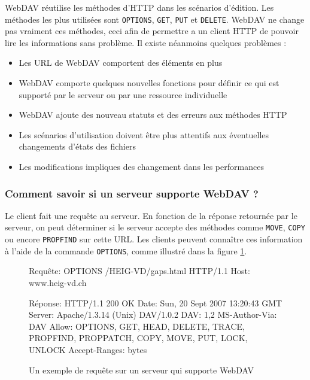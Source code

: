 \documentclass[a4paper, 11pt]{article}
\begin{document}
{		WebDAV réutilise les méthodes d'HTTP dans les scénarios d'édition. Les méthodes les plus utilisées sont \texttt{OPTIONS}, \texttt{GET}, \texttt{PUT} et \texttt{DELETE}. WebDAV ne change pas vraiment ces méthodes, ceci afin de permettre a un client HTTP de pouvoir lire les informations sans problème. Il existe néanmoins quelques problèmes :
		
		\begin{itemize}
			\item Les URL de WebDAV comportent des éléments en plus
			\item WebDAV comporte quelques nouvelles fonctions pour définir ce qui est supporté par le serveur ou par une ressource individuelle
			\item WebDAV ajoute des nouveau statuts et des erreurs aux méthodes HTTP
			\item Les scénarios d'utilisation doivent être plus attentifs aux éventuelles changements d'états des fichiers
			\item Les modifications impliques des changement dans les performances 
		\end{itemize}
		
		\subsubsection{Comment savoir si un serveur supporte WebDAV ?}
		
			Le client fait une requête au serveur. En fonction de la réponse retournée par le serveur, on peut déterminer si le serveur accepte des méthodes comme \texttt{MOVE}, \texttt{COPY} ou encore \texttt{PROPFIND} sur cette URL. Les clients peuvent connaître ces information à l'aide de la commande \texttt{OPTIONS}, comme illustré dans la figure \ref{fig:rep_http_DAV_support}.
			
			\begin{figure}[ht]
			\begin{center}
			\begin{boxedverbatim}
				Requête:
				OPTIONS /HEIG-VD/gaps.html HTTP/1.1
				Host: www.heig-vd.ch
			
				Réponse: 
				HTTP/1.1 200 OK
				Date: Sun, 20 Sept 2007 13:20:43 GMT
				Server: Apache/1.3.14 (Unix) DAV/1.0.2
				DAV: 1,2
				MS-Author-Via: DAV
				Allow: OPTIONS, GET, HEAD, DELETE, TRACE, PROPFIND,
				       PROPPATCH, COPY, MOVE, PUT, LOCK, UNLOCK
				Accept-Ranges: bytes
			\end{boxedverbatim}
			\caption{Un exemple de requête sur un serveur qui supporte WebDAV}
			\label{fig:rep_http_DAV_support}
			\end{center}
			\end{figure}
	
}
\end{document}
